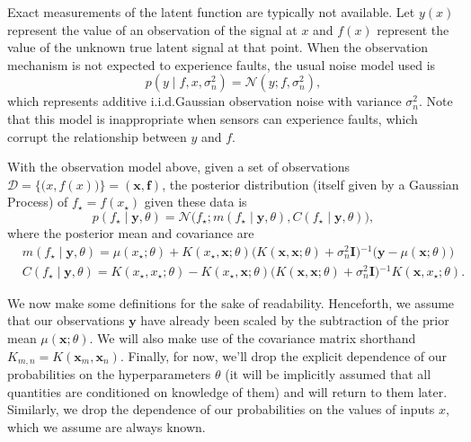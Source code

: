 \documentclass{article} %
\newcommand{\deq}{=}
\newcommand{\given}{\!\ensuremath{\mid}\!}
\newcommand{\cm}[1]{\ensuremath{\mathcal{#1}}}
\newcommand{\bm}[1]{\ensuremath{\mathbf{#1}}}
\newcommand{\data}{\ensuremath{\cm{D}}}
\newcommand{\inv}{\ensuremath{^{-1}}}
\newcommand{\vect}[1]{\bm{#1}}
\newcommand{\vy}{\vect{y}}
\newcommand{\vx}{\vect{x}}
\newcommand{\mean}[2]{{m}(#1\given#2)}
\newcommand{\cov}[2]{{C}(#1\given#2)}
\newcommand{\st}{_{\star}}
\begin{document}
Exact measurements of the latent function are typically not available.
Let $y(x)$ represent the
value of an observation of the signal at $x$ and $f(x)$
represent the value of the unknown true latent signal at that point.
When the observation mechanism is not expected to experience faults,
the usual noise model used is
\begin{equation}\label{iidnoise}
 p(y \given f, x, \sigma_n^2)
 \deq
 \cm{N}(y; f, \sigma_n^2),
\end{equation}
which represents additive i.i.d.\space Gaussian observation noise with
variance $\sigma_n^2$. Note that this model is inappropriate when
sensors can experience faults, which corrupt the relationship
between $y$ and $f$.

With the observation model above, given a set of observations
$
 \data
 \deq
 \bigl\lbrace
   \bigl( x, f(x) \bigr)
 \bigr\rbrace
 \deq
 ( \bm{x}, \bm{f} )
$,
the posterior distribution (itself given by a Gaussian Process) of $f\st \deq f(x\st)$ given these data is
\begin{equation*}
 p(f\st \given \vy, \theta)
 =
 \cm{N}
 \bigl(
   f\st;
   \mean{f\st}{\vy,\theta},
   \cov{f\st}{\vy,\theta}
 \bigr),
\end{equation*}
where the posterior mean and covariance are
\begin{align*}
 &
 \mean{f\st}{\vy,\theta}
 \deq
 \mu(x\st; \theta)
 +
 K(x\st, \bm{x}; \theta)
 \bigl(
 K(\bm{x}, \bm{x}; \theta) + \sigma_n^2 \bm{I}
 \bigr)\inv
 \bigl(
   \bm{y} - \mu(\bm{x}; \theta)
 \bigr)
 \\  
 &
 \cov{f\st}{\vy,\theta}
 \deq
 K(x\st, x\st; \theta)
 -
 K(x\st, \bm{x}; \theta)
 \bigl(
   K(\bm{x}, \bm{x}; \theta) + \sigma_n^2 \bm{I}
 \bigr)\inv
 K(\bm{x}, x\st; \theta).
\end{align*}

We now make some definitions for the sake of readability. Henceforth,
we assume that our observations $\vy$ have already been scaled by the
subtraction of the prior mean $\mu(\bm{x}; \theta)$. We will also make
use of the covariance matrix shorthand $K_{m,n} \deq
K(\vx_m,\vx_n)$. Finally, for now, we'll drop the explicit dependence
of our probabilities on the hyperparameters $\theta$ (it will be
implicitly assumed that all quantities are conditioned on knowledge of
them) and will return to them later. Similarly, we drop the dependence of our probabilities on the values of inputs $x$, which we assume are always known.
\end{document}
